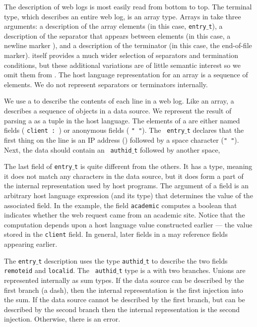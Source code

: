 The \ipads{} description of web logs is most easily read from bottom to top.
The terminal type, which describes an entire web log, is an array type.
Arrays in \ipads{} take three arguments: a description
of the array elements (in this case, {\tt entry$\_$t}),
a description of the separator that appears between elements
(in this case, a newline marker \Peor{}), and 
a description of the terminator (in this case, the end-of-file marker).
\pads{} itself provides a much wider selection of separators and
termination conditions, but these additional variations are of little semantic 
interest so we omit them from \ipads.  
The host language representation for 
an array is a sequence of elements. We do not represent separators or terminators internally.

We use a \Pstruct{} to describe the contents of each line in a web log.
Like an array, a \Pstruct{} describes a sequence of 
objects in a data source.  We represent the result of parsing a \Pstruct{} 
as a tuple in the host language.  The elements
of a \Pstruct{} are either named fields (\eg{} {\tt client : \Pip{}}) or
anonymous fields (\eg{} {\tt " "}).  The \Pstruct{} {\tt
entry$\_$t} declares that the first thing on the line
is an IP address (\Pip) followed by a space
character ({\tt " "}).  Next, the data should contain an {\tt
authid$\_$t} followed by another space, \etc{}

The last field of {\tt entry$\_$t} is quite different from the others.
It has a \Pcompute{} type, meaning it does not match any characters in
the data source, but it does form a part of the internal representation
used by host programs.  The argument of a \Pcompute{}
field is an arbitrary host language expression (and its
type) that determines the value of the associated field.  In the example, the
field {\tt academic} computes a boolean that indicates whether 
the web request came from an academic site. Notice that the computation
depends upon a host language value constructed earlier --- the value
stored in the {\tt client} field.  In general, later fields in a \Pstruct{} may
reference fields appearing earlier.

The {\tt entry$\_$t} description uses the type {\tt authid$\_$t} to
describe the two fields {\tt remoteid} and {\tt localid}.  The {\tt
authid$\_$t} type is a \Punion{} with two branches.  Unions are
represented internally as sum types.  If the data source can be
described by the first branch (a dash), then the internal
representation is the first injection into the sum.  If the data
source cannot be described by the first branch, but can be described
by the second branch then the internal representation is the second
injection.  Otherwise, there is an error.

